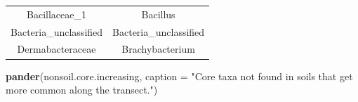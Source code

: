 \documentclass[]{article}
\newenvironment{Shaded}{\begin{snugshade}}{\end{snugshade}}
\newcommand{\DataTypeTok}[1]{\textcolor[rgb]{0.13,0.29,0.53}{#1}}
\newcommand{\KeywordTok}[1]{\textcolor[rgb]{0.13,0.29,0.53}{\textbf{#1}}}
\newcommand{\NormalTok}[1]{#1}
\newcommand{\StringTok}[1]{\textcolor[rgb]{0.31,0.60,0.02}{#1}}
\begin{document}
\begin{longtable}[]{@{}cc@{}}
\begin{minipage}[t]{0.38\columnwidth}
Bacillaceae\_1\strut
\end{minipage} & \begin{minipage}[t]{0.42\columnwidth}\centering
Bacillus\strut
\end{minipage}\tabularnewline
\begin{minipage}[t]{0.38\columnwidth}\centering
Bacteria\_unclassified\strut
\end{minipage} & \begin{minipage}[t]{0.42\columnwidth}\centering
Bacteria\_unclassified\strut
\end{minipage}\tabularnewline
\begin{minipage}[t]{0.38\columnwidth}\centering
Dermabacteraceae\strut
\end{minipage} & \begin{minipage}[t]{0.42\columnwidth}\centering
Brachybacterium\strut
\end{minipage}\tabularnewline
\bottomrule
\end{longtable}

\begin{Shaded}
\begin{Highlighting}[]
\KeywordTok{pander}\NormalTok{(nonsoil.core.increasing, }\DataTypeTok{caption =} \StringTok{"Core taxa not found in soils that get more common along the transect."}\NormalTok{)}
\end{Highlighting}
\end{Shaded}
\end{document}
